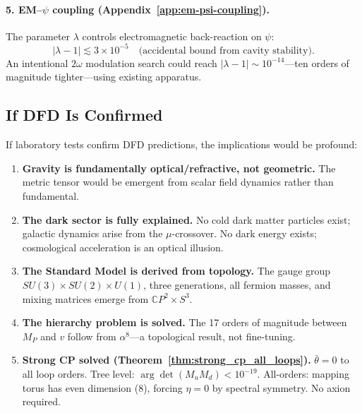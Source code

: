 \paragraph{5. EM--$\psi$ coupling (Appendix~\ref{app:em-psi-coupling}).}
The parameter $\lambda$ controls electromagnetic back-reaction on $\psi$:
\begin{equation}
|\lambda - 1| \lesssim 3 \times 10^{-5} \quad \text{(accidental bound from cavity stability)}.
\end{equation}
An intentional $2\omega$ modulation search could reach $|\lambda - 1| \sim 10^{-14}$---ten orders of magnitude tighter---using existing apparatus.

\subsection{If DFD Is Confirmed}\label{sec:conclusions-if-confirmed}

If laboratory tests confirm DFD predictions, the implications would be profound:

\begin{enumerate}
\item \textbf{Gravity is fundamentally optical/refractive, not geometric.} The metric tensor would be emergent from scalar field dynamics rather than fundamental.

\item \textbf{The dark sector is fully explained.} No cold dark matter particles exist; galactic dynamics arise from the $\mu$-crossover. No dark energy exists; cosmological acceleration is an optical illusion.

\item \textbf{The Standard Model is derived from topology.} The gauge group $SU(3) \times SU(2) \times U(1)$, three generations, all fermion masses, and mixing matrices emerge from $\mathbb{C}P^2 \times S^3$.

\item \textbf{The hierarchy problem is solved.} The 17 orders of magnitude between $M_P$ and $v$ follow from $\alpha^8$---a topological result, not fine-tuning.

\item \textbf{Strong CP solved (Theorem~\ref{thm:strong_cp_all_loops}).} $\bar{\theta} = 0$ to all loop orders. Tree level: $\arg\det(M_u M_d) < 10^{-19}$. All-orders: mapping torus has even dimension (8), forcing $\eta = 0$ by spectral symmetry. No axion required.
\end{enumerate}

